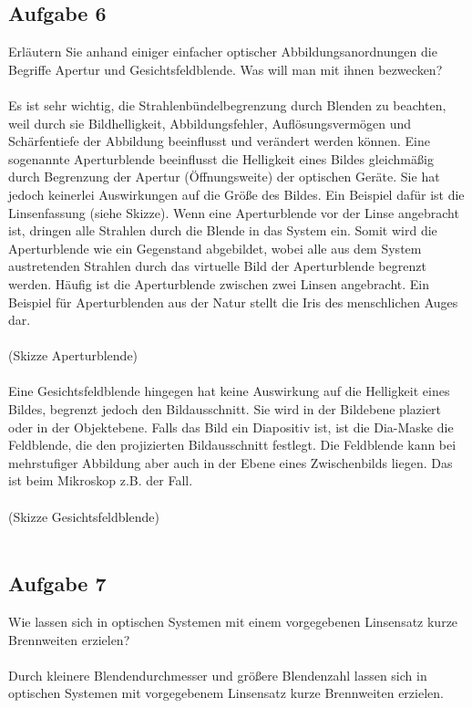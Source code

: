 \documentclass[a4paper,10pt]{scrartcl}
\begin{document}
		\subsection{Aufgabe 6}
			Erläutern Sie anhand einiger einfacher optischer Abbildungsanordnungen die Begriffe Apertur und
			Gesichtsfeldblende. Was will man mit ihnen bezwecken?\\
			\\
			Es ist sehr wichtig, die Strahlenbündelbegrenzung durch Blenden zu beachten, weil durch sie Bildhelligkeit, Abbildungsfehler, Auflösungsvermögen und Schärfentiefe der Abbildung beeinflusst und verändert werden können. Eine sogenannte Aperturblende beeinflusst die Helligkeit eines Bildes gleichmäßig durch Begrenzung der Apertur (Öffnungsweite) der optischen Geräte. Sie hat jedoch keinerlei Auswirkungen auf die Größe des Bildes. Ein Beispiel dafür ist die Linsenfassung (siehe Skizze). Wenn eine Aperturblende vor der Linse angebracht ist, dringen alle Strahlen durch die Blende in das System ein. Somit wird die Aperturblende wie ein Gegenstand abgebildet, wobei alle aus dem System austretenden Strahlen durch das virtuelle Bild der Aperturblende begrenzt werden. Häufig ist die Aperturblende zwischen zwei Linsen angebracht. Ein Beispiel für Aperturblenden aus der Natur stellt die Iris des menschlichen Auges dar.\\
			\\
			(Skizze Aperturblende)\\
			\\
			Eine Gesichtsfeldblende hingegen hat keine Auswirkung auf die Helligkeit eines Bildes, begrenzt jedoch den Bildausschnitt. Sie wird in der Bildebene plaziert oder in der Objektebene. Falls das Bild ein Diapositiv ist, ist die Dia-Maske die Feldblende, die den projizierten Bildausschnitt festlegt. Die Feldblende kann bei mehrstufiger Abbildung aber auch in der Ebene eines Zwischenbilds liegen. Das ist beim Mikroskop z.B. der Fall. \\
			\\
			(Skizze Gesichtsfeldblende)\\
			\\
			
		\subsection{Aufgabe 7}
			Wie lassen sich in optischen Systemen mit einem vorgegebenen Linsensatz kurze Brennweiten
			erzielen?\\
			\\
			Durch kleinere Blendendurchmesser und größere Blendenzahl lassen sich in optischen Systemen mit vorgegebenem Linsensatz kurze Brennweiten erzielen.
			
			
		
	
\end{document}
